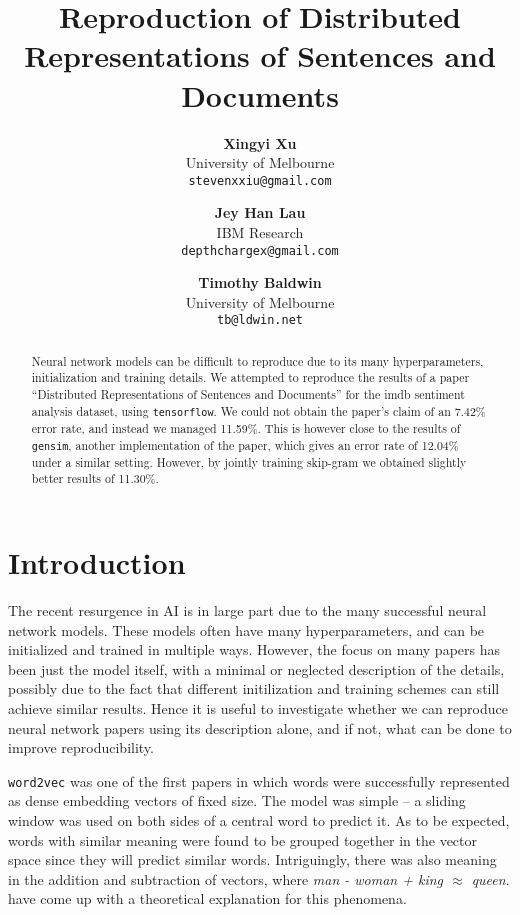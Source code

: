 \documentclass{article}
\begin{document}
\title{Reproduction of Distributed Representations of Sentences and Documents}

\author{
  \textbf{Xingyi Xu} \\ University of Melbourne \\ \texttt{stevenxxiu@gmail.com} \and
  \textbf{Jey Han Lau} \\ IBM Research \\ \texttt{depthchargex@gmail.com} \and
  \textbf{Timothy Baldwin} \\ University of Melbourne \\ \texttt{tb@ldwin.net}
}
\maketitle

\begin{abstract}
Neural network models can be difficult to reproduce due to its many hyperparameters, initialization and training details. We attempted to reproduce the results of a paper ``Distributed Representations of Sentences and Documents'' for the imdb sentiment analysis dataset, using \texttt{tensorflow}. We could not obtain the paper's claim of an 7.42\% error rate, and instead we managed 11.59\%. This is however close to the results of \texttt{gensim}, another implementation of the paper, which gives an error rate of 12.04\% under a similar setting. However, by jointly training skip-gram we obtained slightly better results of 11.30\%.
\end{abstract}

\section{Introduction}
The recent resurgence in AI is in large part due to the many successful neural network models. These models often have many hyperparameters, and can be initialized and trained in multiple ways. However, the focus on many papers has been just the model itself, with a minimal or neglected description of the details, possibly due to the fact that different initilization and training schemes can still achieve similar results. Hence it is useful to investigate whether we can reproduce neural network papers using its description alone, and if not, what can be done to improve reproducibility.

\texttt{word2vec} \citep{mikolov_distributed_2013} was one of the first papers in which words were successfully represented as dense embedding vectors of fixed size. The model was simple -- a sliding window was used on both sides of a central word to predict it. As to be expected, words with similar meaning were found to be grouped together in the vector space since they will predict similar words. Intriguingly, there was also meaning in the addition and subtraction of vectors, where \textit{man - woman + king $\approx$ queen}. \cite{arora_rand-walk:_2015} have come up with a theoretical explanation for this phenomena.
\end{document}
